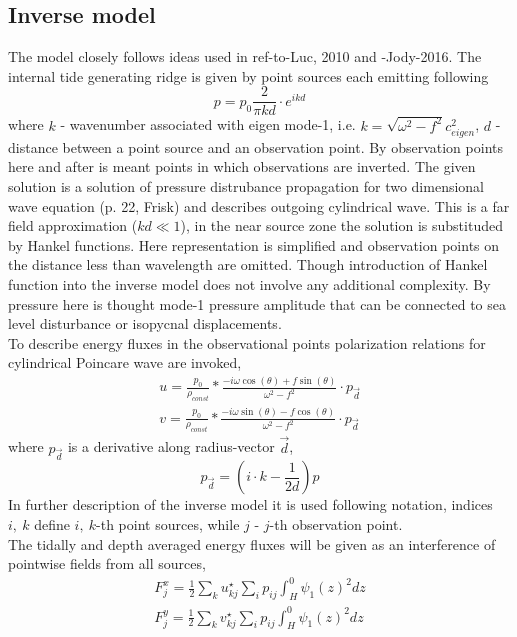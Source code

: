 \documentclass[12pt]{article}
\begin{document}
\subsection{Inverse model}
The model closely follows ideas used in ref-to-Luc, 2010 and -Jody-2016. The internal tide 
generating ridge is given by point sources each emitting following
\begin{equation} \label{invm_eq:1}
p = p_{0} \frac{2}{\pi k d} \cdot e^{i  k  d}
\end{equation}
where $k$ - wavenumber associated with eigen mode-1, i.e. $k = \sqrt{\omega ^ 2 - f ^ 2}{c_{eigen} 
^ 2}$, $d$ - distance between a point source and an observation point. By observation points here 
and after is meant points in which observations are inverted. The given solution is a solution of 
pressure distrubance propagation for two dimensional wave equation (p. 22, Frisk) and describes 
outgoing cylindrical wave. This is a far field approximation ($kd \ll 1$), in the near source zone 
the solution is substituded by Hankel functions. Here representation is simplified and observation 
points on the distance less than wavelength are omitted. Though introduction of Hankel function 
into the inverse model does not involve any additional complexity. By pressure here is thought 
mode-1 pressure amplitude that can be connected to sea level disturbance or isopycnal 
displacements.\\
To describe energy fluxes in the observational points polarization relations for cylindrical 
Poincare wave are invoked,
\begin{align} \label{invm_eq:2}
u = \frac{p_{0}}{\rho_{const}} * \frac{-i \omega \cos(\theta) + f \sin(\theta)}{\omega ^ 2 - f ^ 
2} \cdot p_{\vec{d}}\\
v = \frac{p_{0}}{\rho_{const}} * \frac{-i \omega \sin(\theta) - f \cos(\theta)}{\omega ^ 2 - f ^ 
2} \cdot p_{\vec{d}}
\end{align}
where $p_{\vec{d}}$ is a derivative along radius-vector $\vec{d}$,
\begin{equation}
p_{\vec{d}} = (i \cdot k - \frac{1}{2 d}) p
\end{equation}
In further description of the inverse model it is used following notation, indices $i,~k$ define 
$i,~k$-th point sources, while $j$ - $j$-th observation point.\\
The tidally and depth averaged energy fluxes will be given as an interference of pointwise fields 
from all sources,
\begin{align}
F_{j}^x = \frac{1}{2} \sum_k u_{kj}^{\star} \sum_i p_{ij} \int_H^0 \psi_1(z)^2 dz\\
F_{j}^y = \frac{1}{2} \sum_k v_{kj}^{\star} \sum_i p_{ij} \int_H^0 \psi_1(z)^2 dz
\end{align}
\end{document}
